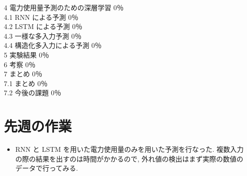 4 電力使用量予測のための深層学習 0％\\
4.1 RNN による予測 0％\\
4.2 LSTM による予測 0％\\
4.3 一様な多入力予測 0％\\
4.4 構造化多入力による予測 0％\\

5 実験結果 0％\\

6 考察 0％\\

7 まとめ 0％\\
7.1 まとめ 0％\\
7.2 今後の課題 0％

%
\newpage
\section{先週の作業}
\begin{itemize}
    \item RNN と LSTM を用いた電力使用量のみを用いた予測を行なった. 複数入力の際の結果を出すのは時間がかかるので, 外れ値の検出はまず実際の数値のデータで行ってみる. 
\end{itemize}
    
